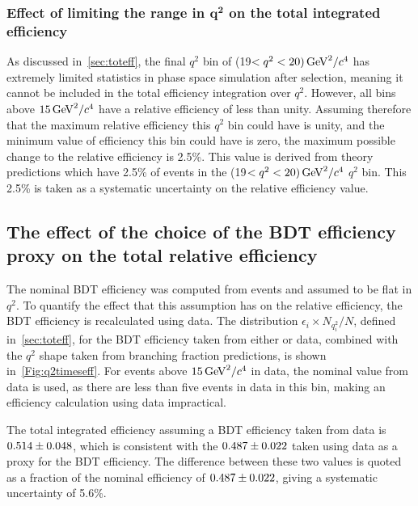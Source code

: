 \subsubsection[Effect of limiting the range in $q^{2}$ on the total integrated efficiency]{Effect of limiting the range in $\mathbold{q^{2}}$ on the total integrated efficiency}
\label{sec:limit}
As discussed in~\autoref{sec:toteff}, the final $q^{2}$ bin of (19$<q^{2}<20) \mathrm{\,Ge\kern -0.1em V}^{2}/c^{4}$ has extremely limited statistics in phase space simulation after selection, meaning it cannot be included in the total efficiency integration over $q^{2}$. However, all bins above $15 \mathrm{\,Ge\kern -0.1em V}^{2}/c^{4}$ have a relative efficiency of less than unity. Assuming therefore that the maximum relative efficiency this $q^{2}$ bin could have is unity, and the minimum value of efficiency this bin could have is zero, the maximum possible change to the relative efficiency is 2.5\%.  This value is derived from \LbL theory predictions which have 2.5\% of events in the (19$<q^{2}<20) \mathrm{\,Ge\kern -0.1em V}^{2}/c^{4}$ $q^{2}$ bin. This 2.5\% is taken as a systematic uncertainty on the relative efficiency value.




\subsection{The effect of the choice of the BDT efficiency proxy on the total relative efficiency}
The nominal BDT efficiency was computed from \LbKjpsi events and assumed to be flat in $q^{2}$. To quantify the effect that this assumption has on the relative efficiency, the BDT efficiency is recalculated using \LbK data.  The distribution $\epsilon_{i}\times N_{q^{2}_{i}}/N$, defined in~\autoref{sec:toteff}, for the BDT efficiency taken from either \LbKjpsi or \LbK data, combined with the $q^{2}$ shape taken from \LbL branching fraction predictions, is shown in~\autoref{Fig:q2timeseff}. For events above $15\mathrm{\,Ge\kern -0.1em V}^{2}/c^{4}$ in \LbK data, the nominal value from \LbKjpsi data is used, as there are less than five events in \LbK data in this bin, making an efficiency calculation using \LbK data impractical.

The total integrated efficiency assuming a BDT efficiency taken from \LbK data is $0.514\pm0.048$, which is consistent with the $0.487\pm0.022$ taken using \LbKjpsi data as a proxy for the BDT efficiency. The difference between these two values is quoted as a fraction of the nominal efficiency of $0.487\pm0.022$, giving a systematic uncertainty of 5.6\%.

